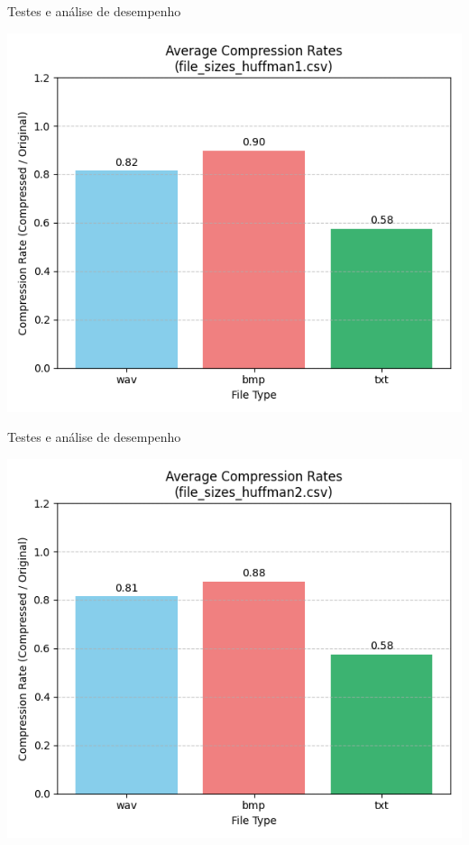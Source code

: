 \documentclass{beamer}
\begin{document}
\begin{frame}{Testes e análise de desempenho}
    \begin{center}
        \includegraphics[width=0.8\linewidth]{imagens/file_sizes_huffman1_compression}
    \end{center}
\end{frame}

\begin{frame}{Testes e análise de desempenho}
    \begin{center}
        \includegraphics[width=0.8\linewidth]{imagens/file_sizes_huffman2_compression}
    \end{center}
\end{frame}
\end{document}
